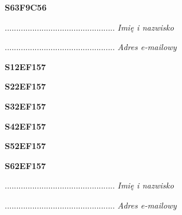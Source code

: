 \begin{turn}{90}\huge \textbf{S63F9C56}\end{turn}

\begin{turn}{90}\begin{minipage}{\linewidth} \vspace{20mm} ................................................  \textit{Imię i nazwisko}\end{minipage}\end{turn}

\begin{turn}{90}\begin{minipage}{\linewidth} \vspace{20mm} ................................................  \textit{Adres e-mailowy}\end{minipage}\end{turn}

\begin{turn}{90}\huge \textbf{S12EF157}\end{turn}

\begin{turn}{90}\huge \textbf{S22EF157}\end{turn}

\begin{turn}{90}\huge \textbf{S32EF157}\end{turn}

\begin{turn}{90}\huge \textbf{S42EF157}\end{turn}

\begin{turn}{90}\huge \textbf{S52EF157}\end{turn}

\begin{turn}{90}\huge \textbf{S62EF157}\end{turn}

\begin{turn}{90}\begin{minipage}{\linewidth} \vspace{20mm} ................................................  \textit{Imię i nazwisko}\end{minipage}\end{turn}

\begin{turn}{90}\begin{minipage}{\linewidth} \vspace{20mm} ................................................  \textit{Adres e-mailowy}\end{minipage}\end{turn}

